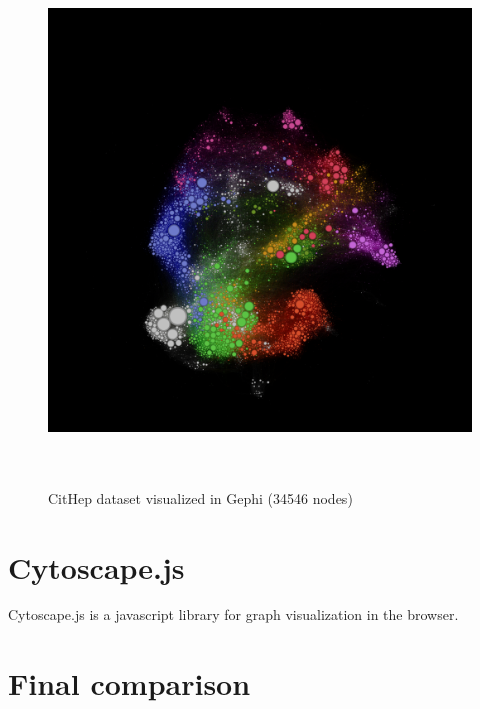 \begin{figure}[p]\centering
  \includegraphics[width=140mm, height=140mm]{img/gephi_cithep_35k.png}
  \caption{CitHep dataset visualized in Gephi (34546 nodes)}
  \label{obr:gephi_cithep}
\end{figure}

\section{Cytoscape.js}
Cytoscape.js is a javascript library for graph visualization in the browser.

\section{Final comparison}